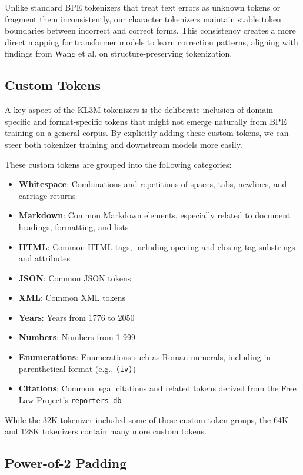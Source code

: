 Unlike standard BPE tokenizers that treat text errors as unknown tokens or fragment them inconsistently, our character tokenizers maintain stable token boundaries between incorrect and correct forms. This consistency creates a more direct mapping for transformer models to learn correction patterns, aligning with findings from Wang et al. \cite{wang2022deepstructure} on structure-preserving tokenization.

\subsection{Custom Tokens}

A key aspect of the KL3M tokenizers is the deliberate inclusion of domain-specific and format-specific tokens that might not emerge naturally from BPE training on a general corpus. By explicitly adding these custom tokens, we can steer both tokenizer training and downstream models more easily. 

These custom tokens are grouped into the following categories:

\begin{itemize}
    \item \textbf{Whitespace}: Combinations and repetitions of spaces, tabs, newlines, and carriage returns
    \item \textbf{Markdown}: Common Markdown elements, especially related to document headings, formatting, and lists
    \item \textbf{HTML}: Common HTML tags, including opening and closing tag substrings and attributes
    \item \textbf{JSON}: Common JSON tokens
    \item \textbf{XML}: Common XML tokens
    \item \textbf{Years}: Years from 1776 to 2050
    \item \textbf{Numbers}: Numbers from 1-999
    \item \textbf{Enumerations}: Enumerations such as Roman numerals, including in parenthetical format (e.g., \texttt{(iv)})
    \item \textbf{Citations}: Common legal citations and related tokens derived from the Free Law Project's \texttt{reporters-db}
\end{itemize}

While the 32K tokenizer included some of these custom token groups, the 64K and 128K tokenizers contain many more custom tokens.

\subsection{Power-of-2 Padding}

